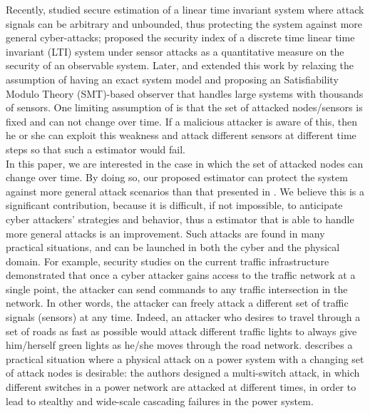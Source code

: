 \documentclass[../../thesis.tex]{subfiles}
\begin{document}
Recently, \cite{Fawzi:2014} studied secure estimation of a linear time invariant system where attack signals can be arbitrary and unbounded, thus protecting the system against more general cyber-attacks; \cite{chong2016characterising} proposed the security index of a discrete time linear time invariant (LTI) system under sensor attacks as a quantitative measure on the security of an observable system.
Later, \cite{Pajic:2014} and \cite{shoukry2016smt} extended this work by relaxing the assumption of having an exact system model and proposing an Satisfiability Modulo Theory (SMT)-based observer that handles large systems with thousands of sensors. One limiting assumption of \cite{Fawzi:2014} \cite{Pajic:2014} \cite{shoukry2016smt} is that the set of attacked nodes/sensors is fixed and can not change over time. If a malicious attacker is aware of this, then he or she can exploit this weakness and attack different sensors at different time steps so that such a estimator would fail.\\
In this paper, we are interested in the case in which the set of attacked nodes can change over time. By doing so, our proposed estimator can protect the system against more general attack scenarios than that presented in \cite{Fawzi:2014}. We believe this is a significant contribution, because it is difficult, if not impossible, to anticipate cyber attackers' strategies and behavior, thus a estimator that is able to handle more general attacks is an improvement. 
Such attacks are found in many practical situations, and can be launched in both the cyber and the physical domain.
For example, security studies on the current traffic infrastructure \cite{ghena2014traffic} demonstrated that once a cyber attacker gains access to the traffic network at a single point, the attacker can send commands to any traffic intersection in the network. In other words, the attacker can freely attack a different set of traffic signals (sensors) at any time. Indeed, an attacker who desires to travel through a set of roads as fast as possible would attack different traffic lights to always give him/herself green lights as he/she moves through the road network. 
\cite{liu2014coordinated} describes a practical situation where a physical attack on a power system with a changing set of attack nodes is desirable: the authors designed a multi-switch attack, in which different switches in a power network are attacked at different times, in order to lead to stealthy and wide-scale cascading failures in the power system.
\end{document}
